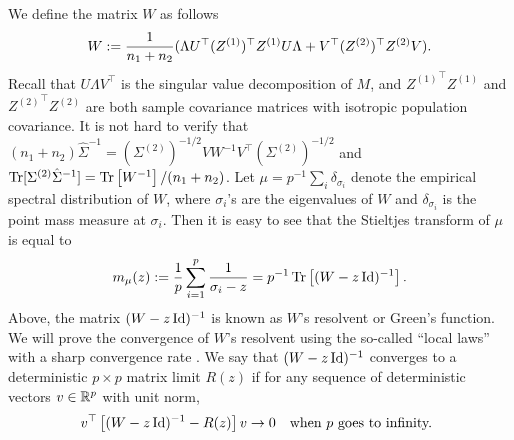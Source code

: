 We define the matrix $W$ as follows
\begin{align}\label{eigen2extra}
	W := \frac{1}{n_1 + n_2}(\Lambda U^\top (Z^{(1)})^\top Z^{(1)} U\Lambda  + V^\top (Z^{(2)})^\top Z^{(2)}V).
\end{align}
Recall that  $U\Lambda V^\top$ is the singular value decomposition of $M$, %
and ${Z^{(1)}}^{\top} Z^{(1)}$ and ${Z^{(2)}}^{\top} Z^{(2)}$ are both sample covariance matrices with isotropic population covariance.
It is not hard to verify that $(n_1 + n_2)\hat{\Sigma}^{-1}= (\Sigma^{(2)})^{-1/2} V W^{-1}V^\top (\Sigma^{(2)})^{-1/2}$ and $\operatorname{Tr}[\Sigma^{(2)} \hat{\Sigma}^{-1}] = \operatorname{Tr}\left[W^{-1}\right] / (n_1 + n_2)$.
Let $\mu=p^{-1}\sum_{i} \delta_{\sigma_i}$ denote the empirical spectral distribution of $W$, where $\sigma_i$'s are the eigenvalues of $W$ and $\delta_{\sigma_i}$ is the point mass measure at $\sigma_i$. Then it is easy to see that the Stieltjes transform of $\mu$ is equal to
 \[ m_{\mu}(z) := \frac{1}{p}\sum_{i=1}^p \frac{1}{\sigma_i - z}= p^{-1}\operatorname{Tr}\left[(W-z\operatorname{Id})^{-1}\right]. \]
Above, the matrix $(W - z\operatorname{Id})^{-1}$ is known as $W$'s resolvent or Green's function.
We will prove the convergence of $W$'s resolvent using the so-called ``local laws'' with a sharp convergence rate \cite{isotropic,erdos2017dynamical,Anisotropic}.
We say that $(W-z\operatorname{Id})^{-1}$ converges to a deterministic $p\times p$ matrix limit $R(z)$ if for any sequence of deterministic vectors $v\in \mathbb{R}^p$ with unit norm, 
$$v^\top \left[(W-z\id)^{-1}-R(z)\right]v\to 0\ \ \ \text{when $p$ goes to infinity.
}$$


